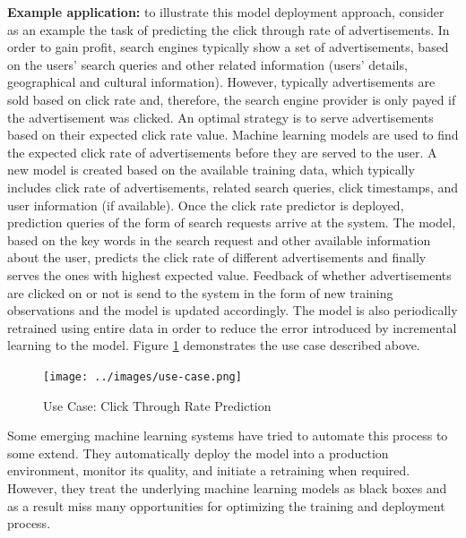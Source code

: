 \documentclass{sig-alternate-05-2015}
\begin{document}
\textbf{Example application:} to illustrate this model deployment approach, consider as an example the task of predicting the click through rate of advertisements.
In order to gain profit, search engines typically show a set of advertisements, based on the users' search queries and other related information (users' details, geographical and cultural information).
However, typically advertisements are sold based on click rate and, therefore, the search engine provider is only payed if the advertisement was clicked.
An optimal strategy is to serve advertisements based on their expected click rate value.
Machine learning models are used to find the expected click rate of advertisements before they are served to the user.
A new model is created based on the available training data, which typically includes click rate of advertisements, related search queries, click timestamps, and user information (if available). 
Once the click rate predictor is deployed, prediction queries of the form of search requests arrive at the system.
The model, based on the key words in the search request and other available information about the user, predicts the click rate of different advertisements and finally serves the ones with highest expected value.
Feedback of whether advertisements are clicked on or not is send to the system in the form of new training observations and the model is updated accordingly.
The model is also periodically retrained using entire data in order to reduce the error introduced by incremental learning to the model.
Figure \ref{fig:click-rate} demonstrates the use case described above.

\begin{figure}[h]
\centering
\texttt{[image: ../images/use-case.png]}
\caption{Use Case: Click Through Rate Prediction}
\label{fig:click-rate}
\end{figure}

Some emerging machine learning systems have tried to automate this process to some extend.
They automatically deploy the model into a production environment, monitor its quality, and initiate a retraining when required.
However, they treat the underlying machine learning models as black boxes and as a result miss many opportunities for optimizing the training and deployment process.
\end{document}
